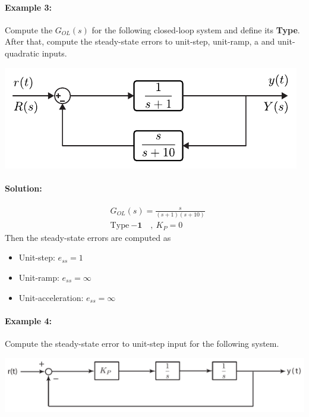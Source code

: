 \documentclass[twoside]{article}
\begin{document}
\paragraph{Example 3:} Compute the $G_{OL}(s)$ for the following closed-loop
system and define its \textbf{Type}. After that, compute the steady-state errors to unit-step, unit-ramp, a
and unit-quadratic inputs.

\begin{center}
\begin{minipage}[h]{0.6\linewidth}
    \begin{center}
      \includegraphics[width=\textwidth]{example3}
    \end{center}
\end{minipage}
\end{center}

\paragraph{Solution:} 
%
\begin{align*}
&G_{OL}(s) =  \frac{s}{(s+1) (s+10)} 
\\
&\mathrm{Type} \ \mathbf{-1}  \quad, \ K_P = 0
\end{align*}
%
Then the steady-state errors are computed as
\begin{itemize}
\item Unit-step: $e_{ss} = 1$
\item Unit-ramp: $e_{ss} = \infty$
\item Unit-acceleration: $e_{ss} = \infty$
\end{itemize}

\paragraph{Example 4:} Compute the steady-state error to unit-step input
for the following system. 

\begin{center}
\begin{minipage}[h]{0.75\linewidth}
    \begin{center}
      \includegraphics[width=\textwidth]{marginal}
    \end{center}
\end{minipage}
\end{center}
\end{document}
